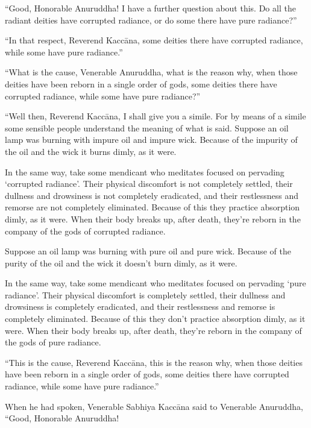 \documentclass[12pt,openany]{book}%
\begin{document}
“Good, Honorable Anuruddha! I have a further question about this. Do all the radiant deities have corrupted radiance, or do some there have pure radiance?” 

“In that respect, Reverend \textsanskrit{Kaccāna}, some deities there have corrupted radiance, while some have pure radiance.” 

“What is the cause, Venerable Anuruddha, what is the reason why, when those deities have been reborn in a single order of gods, some deities there have corrupted radiance, while some have pure radiance?” 

“Well then, Reverend \textsanskrit{Kaccāna}, I shall give you a simile. For by means of a simile some sensible people understand the meaning of what is said. Suppose an oil lamp was burning with impure oil and impure wick. Because of the impurity of the oil and the wick it burns dimly, as it were. 

In the same way, take some mendicant who meditates focused on pervading ‘corrupted radiance’. Their physical discomfort is not completely settled, their dullness and drowsiness is not completely eradicated, and their restlessness and remorse are not completely eliminated. Because of this they practice absorption dimly, as it were. When their body breaks up, after death, they’re reborn in the company of the gods of corrupted radiance. 

Suppose an oil lamp was burning with pure oil and pure wick. Because of the purity of the oil and the wick it doesn’t burn dimly, as it were. 

In the same way, take some mendicant who meditates focused on pervading ‘pure radiance’. Their physical discomfort is completely settled, their dullness and drowsiness is completely eradicated, and their restlessness and remorse is completely eliminated. Because of this they don’t practice absorption dimly, as it were. When their body breaks up, after death, they’re reborn in the company of the gods of pure radiance. 

“This is the cause, Reverend \textsanskrit{Kaccāna}, this is the reason why, when those deities have been reborn in a single order of gods, some deities there have corrupted radiance, while some have pure radiance.” 

When he had spoken, Venerable Sabhiya \textsanskrit{Kaccāna} said to Venerable Anuruddha, “Good, Honorable Anuruddha! 
\end{document}
